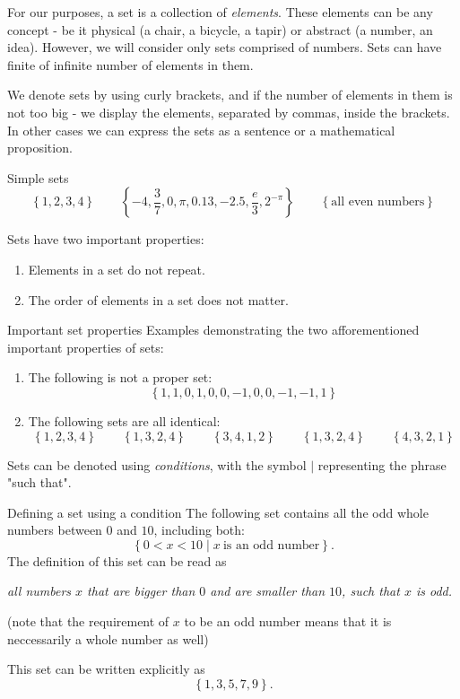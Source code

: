 For our purposes, a set is a collection of \emph{elements}. These elements can be any concept - be it physical (a chair, a bicycle, a tapir) or abstract (a number, an idea). However, we will consider only sets comprised of numbers. Sets can have finite of infinite number of elements in them.

We denote sets by using curly brackets, and if the number of elements in them is not too big - we display the elements, separated by commas, inside the brackets. In other cases we can express the sets as a sentence or a mathematical proposition.

\begin{example}{Simple sets}{}
	\[
		\left\{ 1,2,3,4 \right\}\qquad\left\{ -4,\frac{3}{7},0,\pi,0.13,-2.5,\frac{e}{3},2^{-\pi} \right\}\qquad\left\{ \text{all even numbers} \right\}
	\]
\end{example}

Sets have two important properties:
\begin{enumerate}
	\item Elements in a set do not repeat.
	\item The order of elements in a set does not matter.
\end{enumerate}

\begin{example}{Important set properties}{}
	Examples demonstrating the two afforementioned important properties of sets:
	\begin{enumerate}
		\item The following is not a proper set:
		\[
			\left\{ 1,1,0,1,0,0,-1,0,0,-1,-1,1 \right\}
	\]

		\item The following sets are all identical:
		\[
			\left\{ 1,2,3,4 \right\}\qquad\left\{ 1,3,2,4  \right\}\qquad\left\{ 3,4,1,2 \right\}\qquad\left\{ 1,3,2,4 \right\}\qquad\left\{ 4,3,2,1 \right\}
		\]
	\end{enumerate}
	
\end{example}

Sets can be denoted using \emph{conditions}, with the symbol $|$ representing the phrase "such that".

\begin{example}{Defining a set using a condition}
	The following set contains all the odd whole numbers between $0$ and $10$, including both:
	\[
		\left\{ 0 < x < 10 \mid x\ \text{is an odd number}\right\}.
	\]
	The definition of this set can be read as

	\vspace{3mm}
	\centering
	\textit{all numbers $x$ that are bigger than $0$ and are smaller than $10$, such that $x$ is odd.}

	\flushleft{}
	(note that the requirement of $x$ to be an odd number means that it is neccessarily a whole number as well)

	\vspace{1em}
	This set can be written explicitly as
	\[
		\left\{ 1,3,5,7,9 \right\}.
	\]
\end{example}

